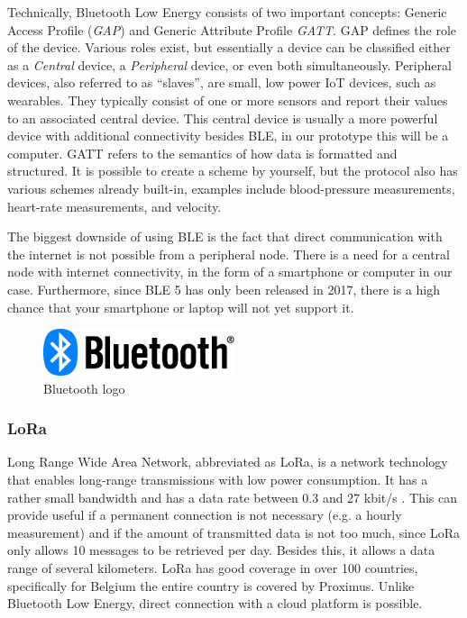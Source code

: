 \documentclass[12pt, a4paper]{article}
\newcommand{\lora}{LoRa}
\newcommand{\bluetooth}{Bluetooth}
\newcommand{\ble}{\bluetooth{} Low Energy}
\newcommand{\bles}{BLE}
\newcommand{\iot}{IoT}
\newcommand{\gap}{GAP}
\newcommand{\gatt}{GATT}
\begin{document}
Technically, \ble{} consists of two important concepts: Generic Access Profile (\emph{\gap}) and Generic Attribute Profile \emph{\gatt}\cite{townsend_2014}. \gap{} defines the role of the device. Various roles exist, but essentially a device can be classified either as a \emph{Central} device, a \emph{Peripheral} device, or even both simultaneously. Peripheral devices, also referred to as ``slaves'', are small, low power \iot{} devices, such as wearables. They typically consist of one or more sensors and report their values to an associated central device. This central device is usually a more powerful device with additional connectivity besides \bles{}, in our prototype this will be a computer. \gatt{} refers to the semantics of how data is formatted and structured. It is possible to create a scheme by yourself, but the protocol also has various schemes already built-in, examples include blood-pressure measurements, heart-rate measurements, and velocity.

The biggest downside of using \bles{} is the fact that direct communication with the internet is not possible from a peripheral node. There is a need for a central node with internet connectivity, in the form of a smartphone or computer in our case. Furthermore, since \bles{} 5 has only been released in 2017, there is a high chance that your smartphone or laptop will not yet support it.

\begin{figure}[htbp]
	\includegraphics[width=0.5\textwidth]{images/bluetooth.pdf}
	\centering
	\caption{\bluetooth{} logo}
\end{figure}

\subsubsection{\lora{}}
Long Range Wide Area Network, abbreviated as \lora, is a network technology that enables long-range transmissions with low power consumption. It has a rather small bandwidth and has a data rate between 0.3 and 27 kbit/s \cite{lorapaper}. This can provide useful if a permanent connection is not necessary (e.g. a hourly measurement) and if the amount of transmitted data is not too much, since \lora{} only allows 10 messages to be retrieved per day. Besides this, it allows a data range of several kilometers. \lora{} has good coverage in over 100 countries, specifically for Belgium the entire country is covered by Proximus. Unlike \ble{}, direct connection with a cloud platform is possible.
\end{document}
